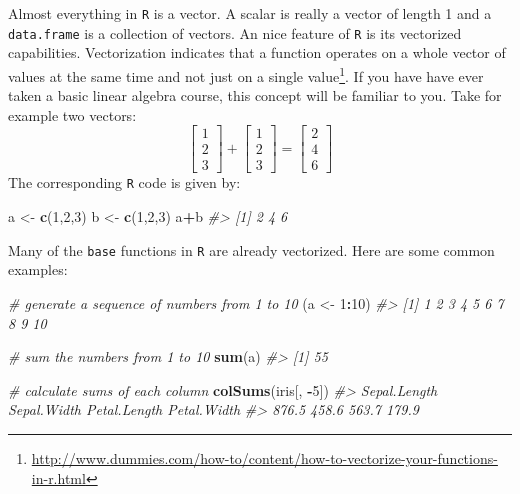 \documentclass[]{book}
\makeatletter
\newenvironment{Shaded}{\begin{snugshade}}{\end{snugshade}}
\newcommand{\KeywordTok}[1]{\textcolor[rgb]{0.13,0.29,0.53}{\textbf{#1}}}
\newcommand{\DecValTok}[1]{\textcolor[rgb]{0.00,0.00,0.81}{#1}}
\newcommand{\StringTok}[1]{\textcolor[rgb]{0.31,0.60,0.02}{#1}}
\newcommand{\CommentTok}[1]{\textcolor[rgb]{0.56,0.35,0.01}{\textit{#1}}}
\newcommand{\OperatorTok}[1]{\textcolor[rgb]{0.81,0.36,0.00}{\textbf{#1}}}
\newcommand{\NormalTok}[1]{#1}
\let\rmarkdownfootnote\footnote%
\def\footnote{\protect\rmarkdownfootnote}
\newenvironment{kframe}{%
\medskip{}
\setlength{\fboxsep}{.8em}
 \def\at@end@of@kframe{}%
 \ifinner\ifhmode%
  \def\at@end@of@kframe{\end{minipage}}%
  \begin{minipage}{\columnwidth}%
 \fi\fi%
 \def\FrameCommand##1{\hskip\@totalleftmargin \hskip-\fboxsep
 \colorbox{shadecolor}{##1}\hskip-\fboxsep
     \hskip-\linewidth \hskip-\@totalleftmargin \hskip\columnwidth}%
 \MakeFramed {\advance\hsize-\width
   \@totalleftmargin\z@ \linewidth\hsize
   \@setminipage}}%
 {\par\unskip\endMakeFramed%
 \at@end@of@kframe}
\renewenvironment{Shaded}{\begin{kframe}}{\end{kframe}}
\theoremstyle{definition}
\theoremstyle{definition}
\theoremstyle{definition}
\theoremstyle{remark}
\makeatother
\begin{document}
Almost everything in \texttt{R} is a vector. A scalar is really a vector
of length 1 and a \texttt{data.frame} is a collection of vectors. An
nice feature of \texttt{R} is its vectorized capabilities. Vectorization
indicates that a function operates on a whole vector of values at the
same time and not just on a single value\footnote{\url{http://www.dummies.com/how-to/content/how-to-vectorize-your-functions-in-r.html}}.
If you have have ever taken a basic linear algebra course, this concept
will be familiar to you. \newline  \vspace{0.1in} Take for example two
vectors: \newline
\vspace{0.1in} \[
\begin{bmatrix} 1 \\ 2 \\ 3 \end{bmatrix} + 
\begin{bmatrix} 1 \\ 2 \\ 3 \end{bmatrix} =
\begin{bmatrix} 2 \\ 4 \\ 6 \end{bmatrix}
\] \newline  \vspace{0.1in} The corresponding \texttt{R} code is given
by:

\begin{Shaded}
\begin{Highlighting}[]
\NormalTok{a <-}\StringTok{ }\KeywordTok{c}\NormalTok{(}\DecValTok{1}\NormalTok{,}\DecValTok{2}\NormalTok{,}\DecValTok{3}\NormalTok{)}
\NormalTok{b <-}\StringTok{ }\KeywordTok{c}\NormalTok{(}\DecValTok{1}\NormalTok{,}\DecValTok{2}\NormalTok{,}\DecValTok{3}\NormalTok{)}
\NormalTok{a}\OperatorTok{+}\NormalTok{b}
\CommentTok{#> [1] 2 4 6}
\end{Highlighting}
\end{Shaded}

Many of the \texttt{base} functions in \texttt{R} are already
vectorized. Here are some common examples:

\begin{Shaded}
\begin{Highlighting}[]

\CommentTok{# generate a sequence of numbers from 1 to 10}
\NormalTok{(a <-}\StringTok{ }\DecValTok{1}\OperatorTok{:}\DecValTok{10}\NormalTok{)}
\CommentTok{#>  [1]  1  2  3  4  5  6  7  8  9 10}

\CommentTok{# sum the numbers from 1 to 10}
\KeywordTok{sum}\NormalTok{(a)}
\CommentTok{#> [1] 55}

\CommentTok{# calculate sums of each column}
\KeywordTok{colSums}\NormalTok{(iris[, }\OperatorTok{-}\DecValTok{5}\NormalTok{])}
\CommentTok{#> Sepal.Length  Sepal.Width Petal.Length  Petal.Width }
\CommentTok{#>        876.5        458.6        563.7        179.9}
\end{Highlighting}
\end{Shaded}
\end{document}
